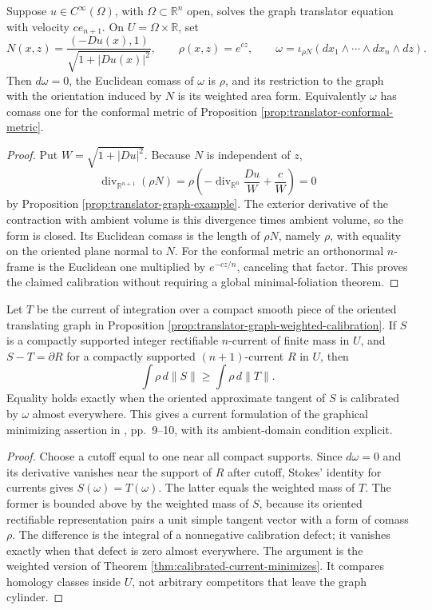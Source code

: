 \begin{proposition}\label{prop:translator-graph-weighted-calibration}
Suppose $u\in C^\infty(\Omega)$, with $\Omega\subset\mathbb R^n$ open, solves the graph translator equation with velocity $ce_{n+1}$. On $U=\Omega\times\mathbb R$, set
\[
 N(x,z)=\frac{(-Du(x),1)}{\sqrt{1+|Du(x)|^2}},\qquad
 \rho(x,z)=e^{cz},\qquad \omega=\iota_{\rho N}(dx_1\wedge\cdots\wedge dx_n\wedge dz).
\]
Then $d\omega=0$, the Euclidean comass of $\omega$ is $\rho$, and its restriction to the graph with the orientation induced by $N$ is its weighted area form. Equivalently $\omega$ has comass one for the conformal metric of Proposition \ref{prop:translator-conformal-metric}.
\end{proposition}
\begin{proof}
Put $W=\sqrt{1+|Du|^2}$. Because $N$ is independent of $z$,
\[
 \operatorname{div}_{\mathbb R^{n+1}}(\rho N)
 =\rho\left(-\operatorname{div}_{\mathbb R^n}\frac{Du}{W}+\frac cW\right)=0
\]
by Proposition \ref{prop:translator-graph-example}. The exterior derivative of the contraction with ambient volume is this divergence times ambient volume, so the form is closed. Its Euclidean comass is the length of $\rho N$, namely $\rho$, with equality on the oriented plane normal to $N$. For the conformal metric an orthonormal $n$-frame is the Euclidean one multiplied by $e^{-cz/n}$, canceling that factor. This proves the claimed calibration without requiring a global minimal-foliation theorem.
\end{proof}

\begin{theorem}\label{thm:translator-graph-current-minimization}
Let $T$ be the current of integration over a compact smooth piece of the oriented translating graph in Proposition \ref{prop:translator-graph-weighted-calibration}. If $S$ is a compactly supported integer rectifiable $n$-current of finite mass in $U$, and $S-T=\partial R$ for a compactly supported $(n+1)$-current $R$ in $U$, then
\[
 \int\rho\,d\|S\|\ge\int\rho\,d\|T\|.
\]
Equality holds exactly when the oriented approximate tangent of $S$ is calibrated by $\omega$ almost everywhere. This gives a current formulation of the graphical minimizing assertion in \cite{HIMW19}, pp.~9--10, with its ambient-domain condition explicit.
\end{theorem}
\begin{proof}
Choose a cutoff equal to one near all compact supports. Since $d\omega=0$ and its derivative vanishes near the support of $R$ after cutoff, Stokes' identity for currents gives $S(\omega)=T(\omega)$. The latter equals the weighted mass of $T$. The former is bounded above by the weighted mass of $S$, because its oriented rectifiable representation pairs a unit simple tangent vector with a form of comass $\rho$. The difference is the integral of a nonnegative calibration defect; it vanishes exactly when that defect is zero almost everywhere. The argument is the weighted version of Theorem \ref{thm:calibrated-current-minimizes}. It compares homology classes inside $U$, not arbitrary competitors that leave the graph cylinder.
\end{proof}

